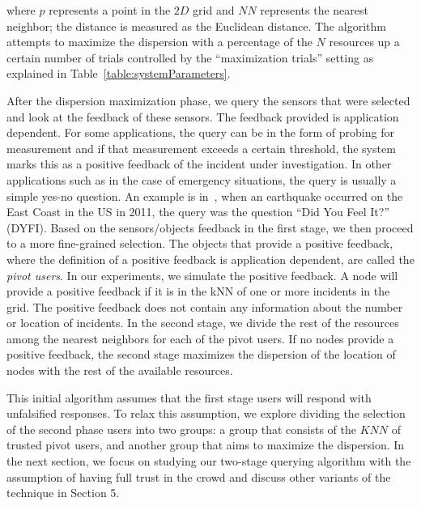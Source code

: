 \documentclass{acm_proc_article-sp}
\begin{document}
where $p$ represents a point in the $2D$ grid and $NN$ represents the nearest neighbor; the distance is measured as the Euclidean distance. The algorithm attempts to maximize the dispersion with a percentage of the $N$ resources up a certain number of trials controlled by the ``maximization trials'' setting as explained in Table~\ref{table:systemParameters}. \par
After the dispersion maximization phase, we query the sensors that were selected and look at the feedback of these sensors. The feedback provided is application dependent. For some applications, the query can be in the form of probing for measurement and if that measurement exceeds a certain threshold, the system marks this as a positive feedback of the incident under investigation. In other applications such as in the case of emergency situations, the query is usually a simple yes-no question. An example is in~\cite{crooks2013earthquake}, when an earthquake occurred on the East Coast in the US in 2011, the query was the question ``Did You Feel It?'' (DYFI). Based on the sensors/objects feedback in the first stage, we then proceed to a more fine-grained selection. The objects that provide a positive feedback, where the definition of a positive feedback is application dependent, are called the \textit{pivot users}. In our experiments, we simulate the positive feedback. A node will provide a positive feedback if it is in the kNN of one or more incidents in the grid. The positive feedback does not contain any information about the number or location of incidents. In the second stage, we divide the rest of the resources among the nearest neighbors for each of the pivot users. If no nodes provide a positive feedback, the second stage maximizes the dispersion of the location of nodes with the rest of the available resources. \par

This initial algorithm assumes that the first stage users will respond with unfalsified responses. To relax this assumption, we explore dividing the selection of the second phase users into two groups: a group that consists of the $KNN$ of trusted pivot users, and another group that aims to maximize the dispersion. In the next section, we focus on studying our two-stage querying algorithm with the assumption of having full trust in the crowd and discuss other variants of the technique in Section 5.\par
\end{document}

